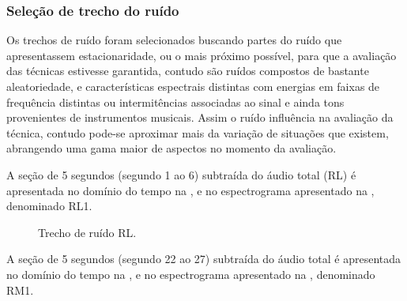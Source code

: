\subsubsection{Seleção de trecho do ruído}
Os trechos de ruído foram selecionados buscando partes do ruído que apresentassem estacionaridade, ou o mais próximo possível, para que a avaliação das técnicas estivesse garantida, contudo são ruídos compostos de bastante aleatoriedade, e características espectrais distintas com energias em faixas de frequência distintas ou intermitências associadas ao sinal e ainda tons provenientes de instrumentos musicais. Assim o ruído influência na avaliação da técnica, contudo pode-se aproximar mais da variação de situações que existem, abrangendo uma gama maior de aspectos no momento da avaliação.

A seção de 5 segundos (segundo 1 ao 6) subtraída do áudio total (RL) é apresentada no domínio do tempo na , e no espectrograma apresentado na , denominado RL1. 


\begin{figure}[H]
\quad
{}
\caption{Trecho de ruído RL.}
\label{ruidos4}
\end{figure}


A seção de 5 segundos (segundo 22 ao 27) subtraída do áudio total é apresentada no domínio do tempo na , e no espectrograma apresentado na  , denominado RM1.


